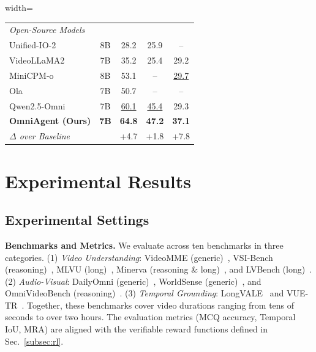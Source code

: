 \documentclass{article}
\theoremstyle{plain}
\theoremstyle{definition}
\theoremstyle{remark}
\begin{document}
\begin{table}[t]
\begin{center}
\begin{normalsize}
\begin{adjustbox}{width=\columnwidth}
\begin{tabular}{l c ccc}
\multicolumn{5}{l}{\textit{Open-Source Models}} \\
Unified-IO-2~\cite{lu2024unified} & 8B & 28.2 & 25.9 & -- \\
VideoLLaMA2~\cite{videollama2} & 7B & 35.2 & 25.4 & 29.2 \\
MiniCPM-o~\cite{yu2025rlaif} & 8B & 53.1 & -- & \underline{29.7} \\
Ola~\cite{liu2025ola} & 7B & 50.7 & -- & -- \\
Qwen2.5-Omni~\cite{qwen2.5omni} & 7B & \underline{60.1} & \underline{45.4} & 29.3 \\
\midrule \addlinespace[0.3em]

\textbf{OmniAgent (Ours)} & \textbf{7B} & \textbf{64.8} & \textbf{47.2} & \textbf{37.1} \\
\multicolumn{2}{l}{\quad \textit{$\Delta$ over Baseline}} & +4.7 & +1.8 & +7.8 \\
\bottomrule
\end{tabular}
\end{adjustbox}
\end{normalsize}
\end{center}
\vskip -0.2in
\end{table}


\section{Experimental Results}
\label{sec:exp}
\subsection{Experimental Settings}
\textbf{Benchmarks and Metrics.} We evaluate across ten benchmarks in three categories. (1) \textit{Video Understanding}: VideoMME (generic)~\cite{fu2025video}, VSI-Bench (reasoning)~\cite{yang2025thinking}, MLVU (long)~\cite{zhou2025mlvu}, Minerva (reasoning \& long)~\cite{nagrani2025minerva}, and LVBench (long)~\cite{wang2025lvbench}. (2) \textit{Audio-Visual}: DailyOmni (generic)~\cite{zhou2025daily}, WorldSense (generic)~\cite{hong2025worldsense}, and OmniVideoBench (reasoning)~\cite{li2025omnivideobench}. (3) \textit{Temporal Grounding}: LongVALE~\cite{geng2025longvale} and VUE-TR~\cite{team2025vidi}.
Together, these benchmarks cover video durations ranging from tens of seconds to over two hours.
The evaluation metrics (MCQ accuracy, Temporal IoU, MRA) are aligned with the verifiable reward functions defined in Sec.~\ref{subsec:rl}.

\vspace{-3mm}
\end{document}
